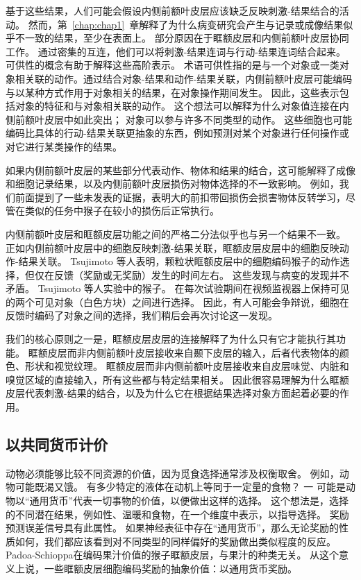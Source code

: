 基于这些结果，人们可能会假设内侧前额叶皮层应该缺乏反映刺激-结果结合的活动。
然而，第~\ref{chap:chap1}~章解释了为什么病变研究会产生与记录或成像结果似乎不一致的结果，至少在表面上。
部分原因在于眶额皮层和内侧前额叶皮层协同工作。
通过密集的互连，他们可以将刺激-结果连词与行动-结果连词结合起来。
可供性的概念有助于解释这些高阶表示。
术语可供性指的是与一个对象或一类对象相关联的动作。通过结合对象-结果和动作-结果关联，内侧前额叶皮层可能编码与以某种方式作用于对象相关的结果，在对象操作期间发生。
因此，这些表示包括对象的特征和与对象相关联的动作。
这个想法可以解释为什么对象值连接在内侧前额叶皮层中如此突出；
对象可以参与许多不同类型的动作。
这些细胞也可能编码比具体的行动-结果关联更抽象的东西，例如预测对某个对象进行任何操作或对它进行某类操作的结果。\par


如果内侧前额叶皮层的某些部分代表动作、物体和结果的结合，这可能解释了成像和细胞记录结果，以及内侧前额叶皮层损伤对物体选择的不一致影响。
例如，我们前面提到了一些未发表的证据，表明大的前扣带回损伤会损害物体反转学习\cite{murray2006prospective}，尽管在类似的任务中猴子在较小的损伤后正常执行\cite{rudebeck2006separate}。\par


内侧前额叶皮层和眶额皮层功能之间的严格二分法似乎也与另一个结果不一致。
正如内侧前额叶皮层中的细胞反映刺激-结果关联\cite{kennerley2009evaluating}，眶额皮层皮层中的细胞反映动作-结果关联。
Tsujimoto 等人\cite{tsujimoto2009monkey}表明，颗粒状眶额皮层中的细胞编码猴子的动作选择，但仅在反馈（奖励或无奖励）发生的时间左右。
这些发现与病变的发现并不矛盾。
Tsujimoto 等人实验中的猴子。
在每次试验期间在视频监视器上保持可见的两个可见对象（白色方块）之间进行选择。
因此，有人可能会争辩说，细胞在反馈时编码了对象之间的选择，我们稍后会再次讨论这一发现。\par


我们的核心原则之一是，眶额皮层皮层的连接解释了为什么只有它才能执行其功能。
眶额皮层而非内侧前额叶皮层接收来自颞下皮层的输入，后者代表物体的颜色、形状和视觉纹理。
眶额皮层而非内侧前额叶皮层接收来自皮层味觉、内脏和嗅觉区域的直接输入，所有这些都与特定结果相关。
因此很容易理解为什么眶额皮层代表刺激-结果的结合，以及为什么它在根据结果选择对象方面起着必要的作用。\par



\subsection{以共同货币计价}

动物必须能够比较不同资源的价值，因为觅食选择通常涉及权衡取舍。
例如，动物可能既渴又饿。
有多少特定的液体在动机上等同于一定量的食物？ 一
可能是动物以“通用货币”代表一切事物的价值，以便做出这样的选择。
这个想法是，选择的不同潜在结果，例如性、温暖和食物，在一个维度中表示，以指导选择\cite{montague2002neural}。
奖励预测误差信号具有此属性。
如果神经表征中存在“通用货币”，那么无论奖励的性质如何，我们都应该看到对不同类型的同样偏好的奖励做出类似程度的反应。
Padoa-Schioppa\cite{padoa2006neurons}在编码果汁价值的猴子眶额皮层，与果汁的种类无关。
从这个意义上说，一些眶额皮层细胞编码奖励的抽象价值：以通用货币奖励。\par


